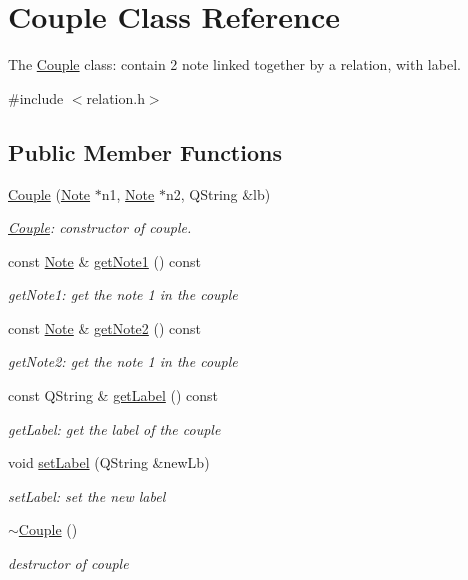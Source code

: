 \hypertarget{class_couple}{}\section{Couple Class Reference}
\label{class_couple}


The \hyperlink{class_couple}{Couple} class\+: contain 2 note linked together by a relation, with label.  




{\ttfamily \#include $<$relation.\+h$>$}

\subsection*{Public Member Functions}
\begin{DoxyCompactItemize}
\item 
\hyperlink{class_couple_a8f1b8ad6f5a177161ea03b35b4af92f1}{Couple} (\hyperlink{class_note}{Note} $\ast$n1, \hyperlink{class_note}{Note} $\ast$n2, Q\+String \&lb)
\begin{DoxyCompactList}\small\item\em \hyperlink{class_couple}{Couple}\+: constructor of couple. \end{DoxyCompactList}\item 
const \hyperlink{class_note}{Note} \& \hyperlink{class_couple_ab1e111ccd47d953bce5a485a40f6e7d2}{get\+Note1} () const
\begin{DoxyCompactList}\small\item\em get\+Note1\+: get the note 1 in the couple \end{DoxyCompactList}\item 
const \hyperlink{class_note}{Note} \& \hyperlink{class_couple_ad3d28199ad0170f65c4564a910167ed6}{get\+Note2} () const
\begin{DoxyCompactList}\small\item\em get\+Note2\+: get the note 1 in the couple \end{DoxyCompactList}\item 
const Q\+String \& \hyperlink{class_couple_a0f04e0130d4d44ce39e322033d85a8df}{get\+Label} () const
\begin{DoxyCompactList}\small\item\em get\+Label\+: get the label of the couple \end{DoxyCompactList}\item 
void \hyperlink{class_couple_aed2c64b89da0544329d98eb5298d984d}{set\+Label} (Q\+String \&new\+Lb)
\begin{DoxyCompactList}\small\item\em set\+Label\+: set the new label \end{DoxyCompactList}\item 
\mbox{\label{class_couple_adb3d0b6785dd4e5ad1fafba5d90df602}} 
\hyperlink{class_couple_adb3d0b6785dd4e5ad1fafba5d90df602}{$\sim$\+Couple} ()
\begin{DoxyCompactList}\small\item\em destructor of couple \end{DoxyCompactList}\end{DoxyCompactItemize}


